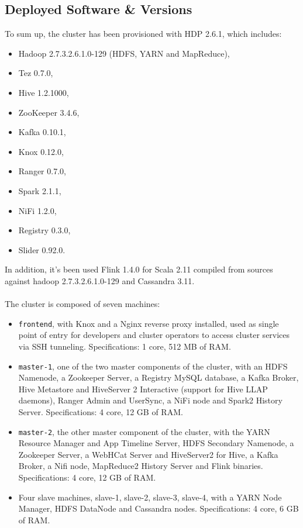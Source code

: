 \subsection{Deployed Software \& Versions}
To sum up, the cluster has been provisioned with HDP 2.6.1, which includes:
\begin{itemize}
    \item Hadoop 2.7.3.2.6.1.0-129 (HDFS, YARN and MapReduce),
    \item Tez 0.7.0,
    \item Hive 1.2.1000, 
    \item ZooKeeper 3.4.6,
    \item Kafka 0.10.1,
    \item Knox 0.12.0,
    \item Ranger 0.7.0,
    \item Spark 2.1.1,
    \item NiFi 1.2.0,
    \item Registry 0.3.0,
    \item Slider 0.92.0.
\end{itemize}

In addition, it's been used Flink 1.4.0 for Scala 2.11 compiled from sources against hadoop 2.7.3.2.6.1.0-129 and Cassandra 3.11.
\\
\\
The cluster is composed of seven machines:
\begin{itemize}
    \item \texttt{frontend}, with Knox and a Nginx reverse proxy installed, used as single point of entry for developers and cluster operators to access cluster services via SSH tunneling. Specifications: 1 core, 512 MB of RAM.
    \item \texttt{master-1}, one of the two master components of the cluster, with an HDFS Namenode, a Zookeeper Server, a Registry MySQL database, a Kafka Broker, Hive Metastore and HiveServer 2 Interactive (support for Hive LLAP daemons), Ranger Admin and UserSync, a NiFi node and Spark2 History Server. Specifications: 4 core, 12 GB of RAM.
    \item \texttt{master-2}, the other master component of the cluster, with the YARN Resource Manager and App Timeline Server, HDFS Secondary Namenode, a Zookeeper Server, a WebHCat Server and HiveServer2 for Hive, a Kafka Broker, a Nifi node, MapReduce2 History Server and Flink binaries. Specifications: 4 core, 12 GB of RAM.
    \item Four slave machines, slave-1, slave-2, slave-3, slave-4, with a YARN Node Manager, HDFS DataNode and Cassandra nodes. Specifications: 4 core, 6 GB of RAM.
\end{itemize}